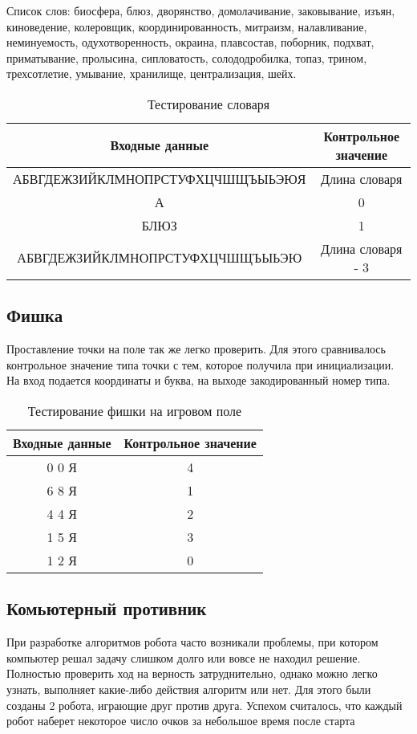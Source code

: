 \documentclass[a4paper,14pt]{article}
\begin{document}
	Список слов: биосфера, блюз, дворянство, домолачивание, заковывание, изъян, киноведение, колеровщик, координированность, митраизм, налавливание, неминуемость, одухотворенность, окраина, плавсостав, поборник, подхват, приматывание, пролысина, сипловатость, солододробилка, топаз, трином, трехсотлетие, умывание, хранилище, централизация, шейх.
	\begin{table}[!h]
		\begin{center}
		\caption{Тестирование словаря}
		\begin{tabular}{|c|c|}
			\hline
			         Входные данные          & Контрольное значение \\ \hline
			АБВГДЕЖЗИЙКЛМНОПРСТУФХЦЧШЩЪЫЬЭЮЯ &    Длина словаря     \\ \hline
			               А                 &          0           \\ \hline
			              БЛЮЗ               &          1           \\ \hline
			АБВГДЕЖЗИЙКЛМНОПРСТУФХЦЧШЩЪЫЬЭЮ  &  Длина словаря - 3   \\ \hline
		\end{tabular}
		\end{center}
	\end{table}

	\subsection{Фишка}
	Проставление точки на поле так же легко проверить. Для этого сравнивалось контрольное значение типа точки с тем, которое получила при инициализации. На вход подается координаты и буква, на выходе закодированный номер типа.
	
	\begin{table}[!h]
		\begin{center}
			\caption{Тестирование фишки на игровом поле}
			\begin{tabular}{|c|c|}
				\hline
				Входные данные          & Контрольное значение \\ \hline
				0 0 Я& 4 \\ \hline
				6 8 Я& 1 \\ \hline
				4 4 Я& 2 \\ \hline
				1 5 Я& 3 \\ \hline
				1 2 Я& 0 \\ \hline
			\end{tabular}
		\end{center}
	\end{table}

	\subsection{Комьютерный противник}
	При разработке алгоритмов робота часто возникали проблемы, при котором компьютер решал задачу слишком долго или вовсе не находил решение. Полностью проверить ход на верность затруднительно, однако можно легко узнать, выполняет какие-либо действия алгоритм или нет. Для этого были созданы 2 робота, играющие друг против друга. Успехом считалось, что каждый робот наберет некоторое число очков за небольшое время после старта
\end{document}
